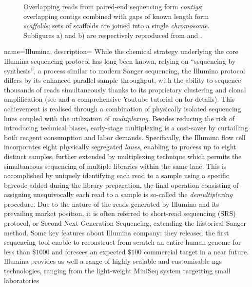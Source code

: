 {{\begin{figure}
\begin{subfigure}[p]{0.4\textwidth}
         \label{subfig:contig2}
     \end{subfigure}
   \caption[\textbf{De novo Assembly Process:}]{Overlapping reads from paired-end sequencing form \textit{contigs}; overlapping contigs combined with gaps of known length form \textit{scaffolds}; sets of scaffolds are joined into a single \textit{chromosome}. Subfigures a) and b) are respectively reproduced from \autocite{california11} and \autocite[Fig.1]{What19}.}
    \label{fig:config}
\end{figure}
}}

{name=Illumina,
description={
While the chemical strategy underlying the core Illumina sequencing protocol has long been known, 
relying on \enquote{sequencing-by-synthesis}, a process similar to modern Sanger sequencing,
the Illumina protocol differs by its enhanced parallel sample-throughput, with the ability to 
sequence thousands of reads simultaneously thanks to its proprietary clustering and clonal amplification (see  
and a comprehensive Youtube tutorial on \autocite{ambrygenetics20} for details).
 This achievement is realised through a combination of physically isolated sequencing lines coupled with the utilization
 of \emph{multiplexing}. Besides reducing the risk of introducing technical biases, early-stage multiplexing is a cost-saver by
 curtailling both reagent consumption and labor demands. Specifically, the Illumina flow cell
 incorporates eight physically segregated \emph{lanes}, enabling to process up to eight distinct samples, further extended by 
 multiplexing technique which permits the simultaneous sequencing of multiple libraries within the same lane. 
 This is accomplished by uniquely identifying each read to a sample using a specific barcode added during the library preparation, 
 the final operation consisting of assigning unequivocally each read to a sample is so-called the \emph{demultiplexing} procedure. 
 Due to the nature of the reads generated by Illumina and its prevailing market position,
 it is often referred to short-read sequencing (SRS) protocol, or Second Next Generation Sequencing, extending the historical Sanger method.
Some key features about Illumina company: they released the first sequencing tool
enable to reconstruct from scratch an entire human genome for less than $\$1000$ 
and foresees an expected $\$100$ commercial target in a near future. 
Illumina provides as well a range of highly scalable and customisable \acrshort{ngs} technologies,
ranging from the light-weight MiniSeq system targetting small laboratories
}}
